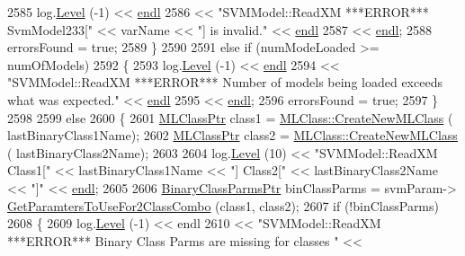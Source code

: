 \begin{DoxyCode}
2585           log.\hyperlink{class_k_k_b_1_1_run_log_a32cf761d7f2e747465fd80533fdbb659}{Level} (-1) << \hyperlink{namespace_k_k_b_ad1f50f65af6adc8fa9e6f62d007818a8}{endl}
2586             << \textcolor{stringliteral}{"SVMModel::ReadXM   ***ERROR***  SvmModel233["} << varName << \textcolor{stringliteral}{"] is invalid."} << 
      \hyperlink{namespace_k_k_b_ad1f50f65af6adc8fa9e6f62d007818a8}{endl}
2587             << \hyperlink{namespace_k_k_b_ad1f50f65af6adc8fa9e6f62d007818a8}{endl};
2588           errorsFound = \textcolor{keyword}{true};
2589         \}
2590 
2591         \textcolor{keywordflow}{else} \textcolor{keywordflow}{if}  (numModeLoaded >= numOfModels)
2592         \{
2593           log.\hyperlink{class_k_k_b_1_1_run_log_a32cf761d7f2e747465fd80533fdbb659}{Level} (-1) << \hyperlink{namespace_k_k_b_ad1f50f65af6adc8fa9e6f62d007818a8}{endl}
2594             << \textcolor{stringliteral}{"SVMModel::ReadXM   ***ERROR***   Number of models being loaded exceeds what was expected."} 
      << \hyperlink{namespace_k_k_b_ad1f50f65af6adc8fa9e6f62d007818a8}{endl}
2595             << \hyperlink{namespace_k_k_b_ad1f50f65af6adc8fa9e6f62d007818a8}{endl};
2596           errorsFound = \textcolor{keyword}{true};
2597         \}
2598 
2599         \textcolor{keywordflow}{else}
2600         \{
2601           \hyperlink{class_k_k_m_l_l_1_1_m_l_class}{MLClassPtr}  class1 = \hyperlink{class_k_k_m_l_l_1_1_m_l_class_a9fd24c617c42d89afc92414575e00e9a}{MLClass::CreateNewMLClass} (
      lastBinaryClass1Name);
2602           \hyperlink{class_k_k_m_l_l_1_1_m_l_class}{MLClassPtr}  class2 = \hyperlink{class_k_k_m_l_l_1_1_m_l_class_a9fd24c617c42d89afc92414575e00e9a}{MLClass::CreateNewMLClass} (
      lastBinaryClass2Name);
2603 
2604           log.\hyperlink{class_k_k_b_1_1_run_log_a32cf761d7f2e747465fd80533fdbb659}{Level} (10) << \textcolor{stringliteral}{"SVMModel::ReadXM     Class1["} << lastBinaryClass1Name << \textcolor{stringliteral}{"]  Class2["} << 
      lastBinaryClass2Name << \textcolor{stringliteral}{"]"} << \hyperlink{namespace_k_k_b_ad1f50f65af6adc8fa9e6f62d007818a8}{endl};
2605 
2606           \hyperlink{class_k_k_m_l_l_1_1_binary_class_parms}{BinaryClassParmsPtr}  binClassParms = svmParam->
      \hyperlink{class_k_k_m_l_l_1_1_s_v_mparam_a781fab93d6c2c65ad180c3e8f17358a9}{GetParamtersToUseFor2ClassCombo} (class1, class2);
2607           \textcolor{keywordflow}{if}  (!binClassParms)
2608           \{
2609             log.\hyperlink{class_k_k_b_1_1_run_log_a32cf761d7f2e747465fd80533fdbb659}{Level} (-1) << endl
2610               << \textcolor{stringliteral}{"SVMModel::ReadXM    ***ERROR***   Binary Class Parms are missing for classes "} << 

\end{DoxyCode}
